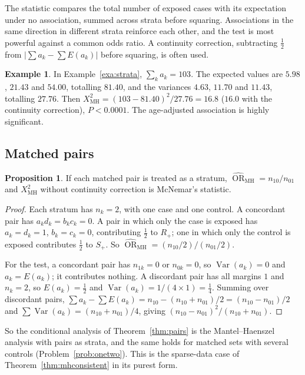 \documentclass[11pt,a4paper]{article}
\numberwithin{equation}{section}
\DeclareMathOperator{\Var}{Var}
\DeclareMathOperator{\OR}{OR}
\theoremstyle{definition}
\newtheorem{exa}[thm]{Example}
\newtheorem{prop}[thm]{Proposition}
\begin{document}
The statistic compares the total number of exposed cases with its expectation under no association, summed across strata before
squaring. Associations in the same direction in different strata reinforce each other, and the test is most powerful against a common
odds ratio. A continuity correction, subtracting $\tfrac12$ from $|\sum a_k - \sum E(a_k)|$ before squaring, is often used.

\begin{exa}
In Example~\ref{exa:strata}, $\sum_k a_k = 103$. The expected values are $5.98$, $21.43$ and $54.00$, totalling $81.40$, and the variances $4.63$, $11.70$ and $11.43$,
totalling $27.76$. Then $X^2_{\text{MH}} = (103 - 81.40)^2/27.76 = 16.8$ ($16.0$ with the continuity correction), $P < 0.0001$. The age-adjusted association is
highly significant.
\end{exa}

\subsection{Matched pairs}

\begin{prop}
\label{prop:mhpairs}
If each matched pair is treated as a stratum, $\widehat{\OR}_{\text{MH}} = n_{10}/n_{01}$ and $X^2_{\text{MH}}$ without continuity correction is McNemar's statistic.
\end{prop}

\begin{proof}
Each stratum has $n_k = 2$, with one case and one control. A concordant pair has $a_k d_k = b_k c_k = 0$. A pair in which only the case is exposed has
$a_k = d_k = 1$, $b_k = c_k = 0$, contributing $\tfrac12$ to $R_+$; one in which only the control is exposed contributes $\tfrac12$ to $S_+$. So $\widehat{\OR}_{\text{MH}} = (n_{10}/2)/(n_{01}/2)$.

For the test, a concordant pair has $n_{1k} = 0$ or $n_{0k} = 0$, so $\Var(a_k) = 0$ and $a_k = E(a_k)$; it contributes nothing. A discordant pair has all margins $1$ and $n_k = 2$,
so $E(a_k) = \tfrac12$ and $\Var(a_k) = 1/(4 \times 1) = \tfrac14$. Summing over discordant pairs, $\sum a_k - \sum E(a_k) = n_{10} - (n_{10} + n_{01})/2 = (n_{10} - n_{01})/2$ and
$\sum \Var(a_k) = (n_{10} + n_{01})/4$, giving $(n_{10} - n_{01})^2/(n_{10} + n_{01})$.
\end{proof}

So the conditional analysis of Theorem~\ref{thm:pairs} is the Mantel--Haenszel analysis with pairs as strata, and the same holds for matched
sets with several controls (Problem~\ref{prob:onetwo}). This is the sparse-data case of Theorem~\ref{thm:mhconsistent} in its purest form.
\end{document}
